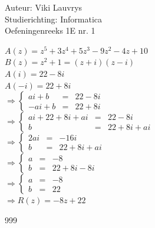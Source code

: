 \documentclass[a4paper]{article}
\begin{document}
  
\noindent \large Auteur: Viki Lauvrys        \\
\noindent \large Studierichting: Informatica \\
\noindent \large Oefeningenreeks 1E nr. 1 \\

\medskip

\normalsize

$ A(z) = z^5 +3z^4 + 5z^3 - 9z^2 - 4z + 10 $ \\

$ B(z) = z^2 + 1 = (z + i)(z - i) $ \\

$ A(i) = 22 - 8i $ \\

$ A(-i) = 22 + 8i $ \\


$\Rightarrow\left\{
	\begin{array}{lll}
		ai + b & = & 22 - 8i \\
		-ai + b & = & 22 + 8i
	\end{array}
\right . $ \\

$\Rightarrow\left\{
	\begin{array}{lll}
		ai + 22 + 8i + ai & = & 22 - 8i \\
		b & = & 22 + 8i + ai
	\end{array}
\right . $ \\

$\Rightarrow\left\{
	\begin{array}{lll}
		2ai & = & - 16i \\
		b & = & 22 + 8i + ai
	\end{array}
\right . $ \\

$\Rightarrow\left\{
	\begin{array}{lll}
		a & = & - 8 \\
		b & = & 22 + 8i - 8i
	\end{array}
\right . $ \\

$\Rightarrow\left\{
	\begin{array}{lll}
		a & = & - 8 \\
		b & = & 22
	\end{array}
\right . $ \\

$\Rightarrow R(z) = -8z + 22 $ \\

\begin{thebibliography}{999}
\end{thebibliography}
\end{document}
